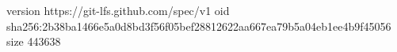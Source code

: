 version https://git-lfs.github.com/spec/v1
oid sha256:2b38ba1466e5a0d8bd3f56f05bef28812622aa667ea79b5a04eb1ee4b9f45056
size 443638
